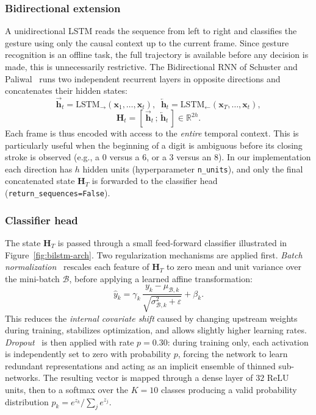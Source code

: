 \subsubsection*{Bidirectional extension}

A unidirectional LSTM reads the sequence from left to right and classifies
the gesture using only the causal context up to the current frame. Since
gesture recognition is an offline task, the full trajectory is available
before any decision is made, this is unnecessarily restrictive. The
Bidirectional RNN of Schuster and Paliwal~\cite{Schuster1997} runs two
independent recurrent layers in opposite directions and concatenates their
hidden states:
\begin{equation}
    \overrightarrow{\mathbf{h}}_t = \mathrm{LSTM}_{\!\rightarrow}(\mathbf{x}_1, \dots, \mathbf{x}_t),
    \;\;
    \overleftarrow{\mathbf{h}}_t = \mathrm{LSTM}_{\!\leftarrow}(\mathbf{x}_T, \dots, \mathbf{x}_t),
\end{equation}
\begin{equation}
    \mathbf{H}_t = \left[\, \overrightarrow{\mathbf{h}}_t \,;\, \overleftarrow{\mathbf{h}}_t \,\right] \in \mathbb{R}^{2h}.
\end{equation}
Each frame is thus encoded with access to the \emph{entire} temporal
context. This is particularly useful when the beginning of a digit is
ambiguous before its closing stroke is observed (e.g., a 0 versus a 6, or
a 3 versus an 8). In our implementation each direction has $h$ hidden units
(hyperparameter \texttt{n\_units}), and only the final concatenated state
$\mathbf{H}_T$ is forwarded to the classifier head (\texttt{return\_sequences=False}).

\subsubsection*{Classifier head}

The state $\mathbf{H}_T$ is passed through a small feed-forward classifier
illustrated in Figure~\ref{fig:bilstm-arch}. Two regularization mechanisms
are applied first. \emph{Batch normalization}~\cite{Ioffe2015} rescales
each feature of $\mathbf{H}_T$ to zero mean and unit variance over the
mini-batch $\mathcal{B}$, before applying a learned affine transformation:
\begin{equation}
    \hat{y}_k = \gamma_k \,\frac{y_k - \mu_{\mathcal{B},k}}{\sqrt{\sigma^2_{\mathcal{B},k} + \varepsilon}} + \beta_k.
\end{equation}
This reduces the \emph{internal covariate shift} caused by changing
upstream weights during training, stabilizes optimization, and allows
slightly higher learning rates. \emph{Dropout}~\cite{Srivastava2014} is
then applied with rate $p = 0.30$: during training only, each activation
is independently set to zero with probability $p$, forcing the network to
learn redundant representations and acting as an implicit ensemble of
thinned sub-networks. The resulting vector is mapped through a dense layer
of $32$ ReLU units, then to a softmax over the $K = 10$ classes producing
a valid probability distribution
$p_k = e^{z_k} / \sum_{j} e^{z_j}$.

